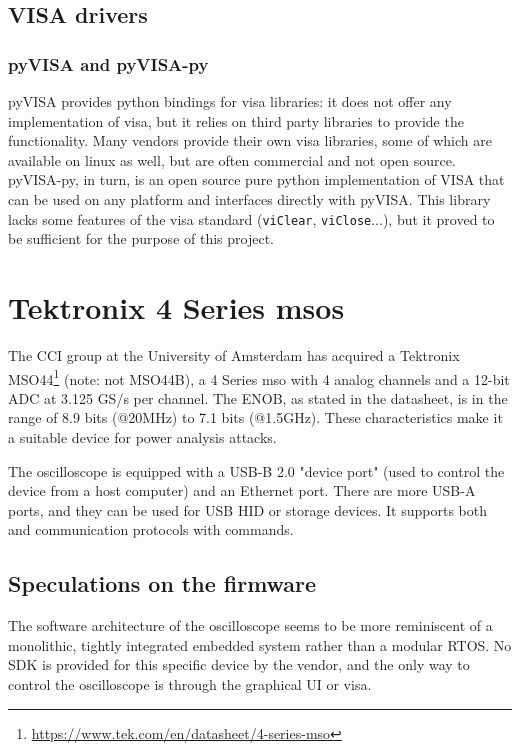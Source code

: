 \documentclass[a4paper,english,twoside,10pt]{article}
\begin{document}
\subsection{VISA drivers}
\subsubsection{pyVISA and pyVISA-py}
pyVISA provides python bindings for \gls{visa} libraries: it does not offer any implementation of \gls{visa}, but it relies on third party libraries to provide the functionality. Many vendors provide their own \gls{visa} libraries, some of which are available on linux as well, but are often commercial and not open source. pyVISA-py, in turn, is an open source pure python implementation of VISA that can be used on any platform and interfaces directly with pyVISA. This library lacks some features of the \gls{visa} standard (\texttt{viClear}, \texttt{viClose}...), but it proved to be sufficient for the purpose of this project.

\section{Tektronix 4 Series \texorpdfstring{\glspl{mso}}{MSO}}
The CCI group at the University of Amsterdam has acquired a Tektronix MSO44\footnote{\url{https://www.tek.com/en/datasheet/4-series-mso}} (note: not MSO44B), a 4 Series \gls{mso} with 4 analog channels and a 12-bit ADC at 3.125 GS/s per channel. The ENOB, as stated in the datasheet, is in the range of 8.9 bits (@20MHz) to 7.1 bits (@1.5GHz). These characteristics make it a suitable device for power analysis attacks.

The oscilloscope is equipped with a USB-B 2.0 "device port" (used to control the device from a host computer) and an Ethernet port. There are more USB-A ports, and they can be used for USB HID or storage devices. It supports both  and  communication protocols with  commands.

\subsection{Speculations on the firmware}\label{sec:fw-info}
The software architecture of the oscilloscope seems to be more reminiscent of a monolithic, tightly integrated embedded system rather than a modular RTOS. No SDK is provided for this specific device by the vendor, and the only way to control the oscilloscope is through the graphical UI or \gls{visa}.
\end{document}
